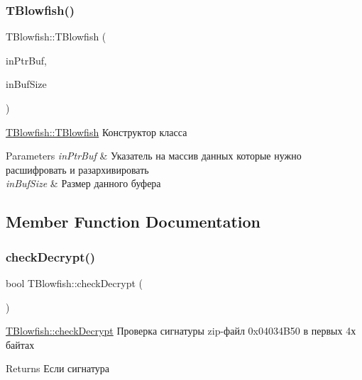 \subsubsection{\texorpdfstring{T\+Blowfish()}{TBlowfish()}}
{\footnotesize\ttfamily T\+Blowfish\+::\+T\+Blowfish (\begin{DoxyParamCaption}\item[{td\+Ptr\+Buf}]{in\+Ptr\+Buf,  }\item[{quint32}]{in\+Buf\+Size }\end{DoxyParamCaption})}



\hyperlink{classblowfish_lib_1_1_t_blowfish_a349e59d7c45d5675376b89def7500c16}{T\+Blowfish\+::\+T\+Blowfish} Конструктор класса 


\begin{DoxyParams}{Parameters}
{\em in\+Ptr\+Buf} & Указатель на массив данных которые нужно расшифровать и разархивировать \\
\hline
{\em in\+Buf\+Size} & Размер данного буфера \\
\hline
\end{DoxyParams}


\subsection{Member Function Documentation}
\mbox{\label{classblowfish_lib_1_1_t_blowfish_a53eba59c588fafe24260a0cf05b7866b}} 
\subsubsection{\texorpdfstring{check\+Decrypt()}{checkDecrypt()}}
{\footnotesize\ttfamily bool T\+Blowfish\+::check\+Decrypt (\begin{DoxyParamCaption}{ }\end{DoxyParamCaption})}



\hyperlink{classblowfish_lib_1_1_t_blowfish_a53eba59c588fafe24260a0cf05b7866b}{T\+Blowfish\+::check\+Decrypt} Проверка сигнатуры zip-\/файл 0x04034\+B50 в первых 4х байтах 

\begin{DoxyReturn}{Returns}
Если сигнатура 
\end{DoxyReturn}
\mbox{\label{classblowfish_lib_1_1_t_blowfish_aa6cf535926e4a3daae058725a6192619}} 
